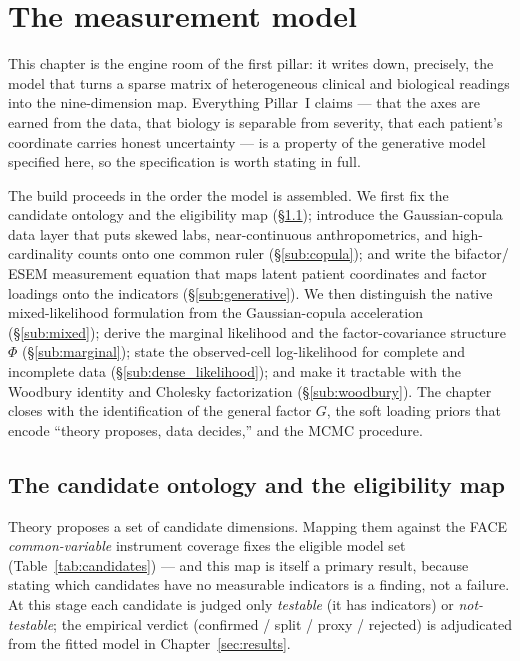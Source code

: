 \section{The measurement model}
\label{sec:model}

This chapter is the engine room of the first pillar: it writes down, precisely, the model that turns a sparse
matrix of heterogeneous clinical and biological readings into the nine-dimension map. Everything Pillar~I claims
--- that the axes are earned from the data, that biology is separable from severity, that each patient's
coordinate carries honest uncertainty --- is a property of the generative model specified here, so the
specification is worth stating in full.

The build proceeds in the order the model is assembled. We first fix the candidate ontology and the eligibility
map (\S\ref{sub:ontology}); introduce the Gaussian-copula data layer that puts skewed labs, near-continuous
anthropometrics, and high-cardinality counts onto one common ruler (\S\ref{sub:copula}); and write the bifactor/
ESEM measurement equation that maps latent patient coordinates and factor loadings onto the indicators
(\S\ref{sub:generative}). We then distinguish the native mixed-likelihood formulation from the Gaussian-copula
acceleration (\S\ref{sub:mixed}); derive the marginal likelihood and the factor-covariance structure $\Phi$
(\S\ref{sub:marginal}); state the observed-cell log-likelihood for complete and incomplete data
(\S\ref{sub:dense_likelihood}); and make it tractable with the Woodbury identity and Cholesky factorization
(\S\ref{sub:woodbury}). The chapter closes with the identification of the general factor $G$, the soft loading
priors that encode ``theory proposes, data decides,'' and the MCMC procedure.

\subsection{The candidate ontology and the eligibility map}
\label{sub:ontology}
Theory proposes a set of candidate dimensions. Mapping them against the FACE \emph{common-variable} instrument
coverage fixes the eligible model set (Table~\ref{tab:candidates}) --- and this map is itself a primary result,
because stating which candidates have no measurable indicators is a finding, not a failure. At this stage each
candidate is judged only \emph{testable} (it has indicators) or \emph{not-testable}; the empirical verdict
(confirmed / split / proxy / rejected) is adjudicated from the fitted model in Chapter~\ref{sec:results}.

